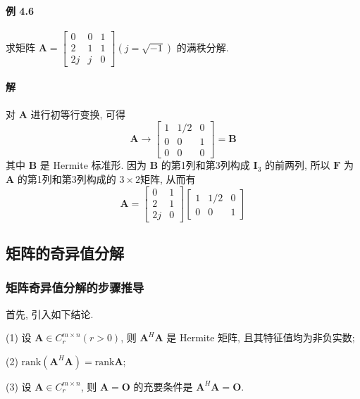 \paragraph*{例 4.6} 求矩阵 $\bm{A} = \begin{bmatrix}
        0  & 0 & 1 \\
        2  & 1 & 1 \\
        2j & j & 0
    \end{bmatrix}(j = \sqrt{-1})$ 的满秩分解.

\paragraph*{解} 对 $\bm{A}$ 进行初等行变换, 可得
$$
    \bm{A} \to \begin{bmatrix}
        1 & 1/2 & 0 \\
        0 & 0   & 1 \\
        0 & 0   & 0
    \end{bmatrix} = \bm{B}
$$
其中 $\bm{B}$ 是 Hermite 标准形. 因为 $\bm{B}$ 的第1列和第3列构成 $\bm{I}_3$ 的前两列, 所以 $\bm{F}$ 为 $\bm{A}$
的第1列和第3列构成的 $3\times 2$矩阵, 从而有
$$
    \bm{A} = \begin{bmatrix}
        0  & 1 \\
        2  & 1 \\
        2j & 0
    \end{bmatrix}\begin{bmatrix}
        1 & 1/2 & 0 \\
        0 & 0   & 1
    \end{bmatrix}
$$

\subsection{矩阵的奇异值分解}

\subsubsection{矩阵奇异值分解的步骤推导}

\par 首先, 引入如下结论.
\par (1) 设 $\bm{A} \in C^{m\times n}_r (r > 0)$, 则 $\bm{A}^H\bm{A}$ 是 Hermite 矩阵, 且其特征值均为非负实数;
\par (2) $\mathrm{rank}(\bm{A}^H\bm{A}) = \mathrm{rank}\bm{A}$;
\par (3) 设 $\bm{A} \in C^{m\times n}_r$, 则 $\bm{A} = \bm{O}$ 的充要条件是 $\bm{A}^H\bm{A} = \bm{O}$.

